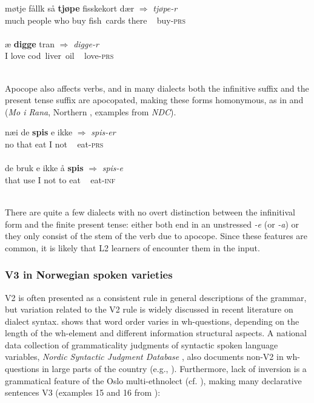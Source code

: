 \documentclass[output=paper,colorlinks,citecolor=brown,modfonts,nonflat]{../langscibook}
\begin{document}
\ea%
    \label{ex:emilsen:11}
\gll møtje fållk så \textbf{tjøpe} fisskekort dær ${\Rightarrow}$ \textit{tjøpe-r}\\
 much people who buy  fish~cards there ~ buy-\textsc{prs}\\
  \\

\ex%
    \label{ex:emilsen:12}
\gll æ \textbf{digge} tran ${\Rightarrow}$ \textit{digge-r}\\
 I love  cod~liver~oil ~ love-\textsc{prs}\\
  \\
\z

Apocope also affects verbs, and in many dialects both the infinitive suffix and the present tense suffix are apocopated, making these forms homonymous, as in  and  (\textit{Mo i Rana}, Northern , examples from \textit{NDC}).


\ea%
    \label{ex:emilsen:13}
\gll næi de \textbf{spis} e ikke ${\Rightarrow}$ \textit{spis-er} \\
 no that eat  I not ~ eat-\textsc{prs} \\
     \\

\ex%
    \label{ex:emilsen:14}
\gll de bruk e ikke å \textbf{spis} ${\Rightarrow}$ \textit{spis-e}\\
 that use I not to eat ~ eat-\textsc{inf}\\
  \\
\z

There are quite a few dialects with no overt distinction between the infinitival form and the finite present tense: either both end in an unstressed \textit{{}-e} (or \textit{{}-a}) or they only consist of the stem of the verb due to apocope. Since these features are common, it is likely that L2 learners of  encounter them in the input. 

\subsubsection{V3 in Norwegian spoken varieties}%

V2 is often presented as a consistent rule in general descriptions of the  grammar, but variation related to the V2 rule is widely discussed in recent literature on dialect syntax. \citet{Westergaard2008} shows that word order varies in wh-questions, depending on the length of the wh-element and different information structural aspects. A national data collection of grammaticality judgments of syntactic spoken language variables, \textit{Nordic Syntactic Judgment Database} \citep{LindstadEtAl2009}, also documents non-V2 in wh-questions in large parts of the country (e.g., \citealt{VangsnesWestergaard2014}). Furthermore, lack of inversion is a grammatical feature of the Oslo multi-ethnolect (cf. \citealt{SvendsenRøyneland2008, OpsahlNistov2010}), making many declarative sentences V3 (examples 15 and 16 from \citealt{OpsahlNistov2010}):
\end{document}
